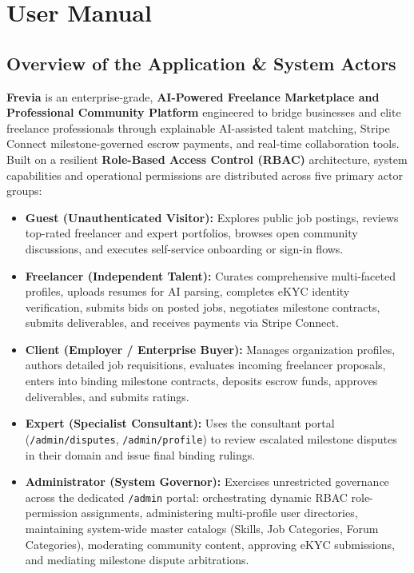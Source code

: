 
\section{User Manual}

\subsection{Overview of the Application \& System Actors}

\textbf{Frevia} is an enterprise-grade, \textbf{AI-Powered Freelance Marketplace and Professional Community Platform} engineered to bridge businesses and elite freelance professionals through explainable AI-assisted talent matching, Stripe Connect milestone-governed escrow payments, and real-time collaboration tools. Built on a resilient \textbf{Role-Based Access Control (RBAC)} architecture, system capabilities and operational permissions are distributed across five primary actor groups:

\begin{itemize}[leftmargin=1.5em,itemsep=3pt]
  \item \textbf{Guest (Unauthenticated Visitor):} Explores public job postings, reviews top-rated freelancer and expert portfolios, browses open community discussions, and executes self-service onboarding or sign-in flows.
  \item \textbf{Freelancer (Independent Talent):} Curates comprehensive multi-faceted profiles, uploads resumes for AI parsing, completes eKYC identity verification, submits bids on posted jobs, negotiates milestone contracts, submits deliverables, and receives payments via Stripe Connect.
  \item \textbf{Client (Employer / Enterprise Buyer):} Manages organization profiles, authors detailed job requisitions, evaluates incoming freelancer proposals, enters into binding milestone contracts, deposits escrow funds, approves deliverables, and submits ratings.
  \item \textbf{Expert (Specialist Consultant):} Uses the consultant portal (\texttt{/admin/\allowbreak{}disputes}, \texttt{/admin/\allowbreak{}profile}) to review escalated milestone disputes in their domain and issue final binding rulings.
  \item \textbf{Administrator (System Governor):} Exercises unrestricted governance across the dedicated \texttt{/admin} portal: orchestrating dynamic RBAC role-permission assignments, administering multi-profile user directories, maintaining system-wide master catalogs (Skills, Job Categories, Forum Categories), moderating community content, approving eKYC submissions, and mediating milestone dispute arbitrations.
\end{itemize}

